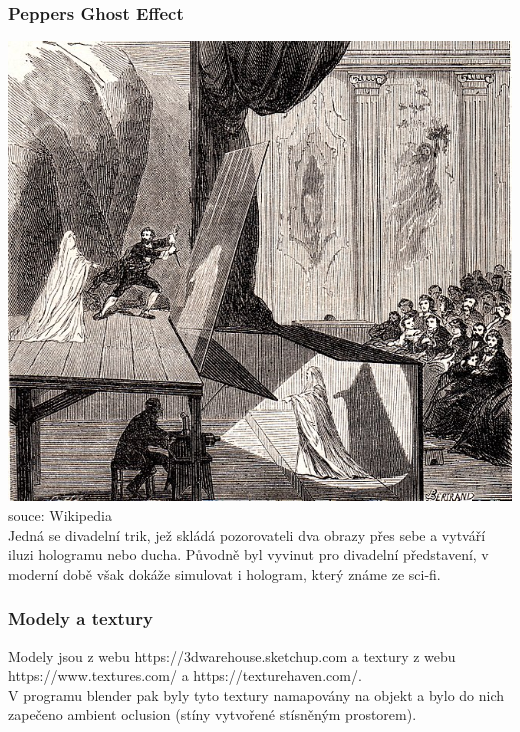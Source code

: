 \subsubsection{Peppers Ghost Effect}
\includegraphics[width=.5\textwidth]{img/Peppers_Ghost.jpg}souce: Wikipedia\\
Jedná se divadelní trik, jež skládá pozorovateli dva obrazy přes sebe a vytváří iluzi
hologramu nebo ducha. Původně byl vyvinut pro divadelní představení, v moderní
době však dokáže simulovat i hologram, který známe ze sci-fi.

\subsubsection{Modely a textury}
Modely jsou z webu https://3dwarehouse.sketchup.com a
textury z webu https://www.textures.com/ a https://texturehaven.com/.\\
V programu blender pak byly tyto textury namapovány na objekt a bylo do nich
zapečeno ambient oclusion (stíny vytvořené stísněným prostorem).

